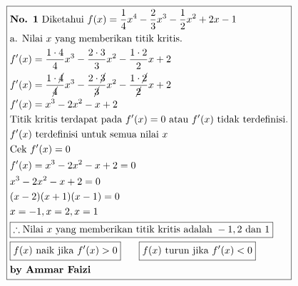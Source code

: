 \documentclass[13pt]{article}
\begin{document}
\par\noindent
\begin{fleqn}[4em]

\begin{align*}
\boxed{\begin{aligned}
  & \textbf{No. 1} \text{ Diketahui }
    f(x) = \frac{1}{4} x^4 - \frac{2}{3} x^3 - \frac{1}{2} x^2 + 2x - 1 \\
  & \text{a. Nilai } x \text{ yang memberikan titik kritis.} \\
  & f'(x) = \frac{1 \cdot 4}{4} x^3 - \frac{2 \cdot 3}{3} x^2 - \frac{1 \cdot 2}{2} x + 2 \\
  & f'(x) = \frac{1 \cdot \cancel{4}}{\cancel{4}} x^3 - \frac{2 \cdot \cancel{3}}{\cancel{3}} x^2 - \frac{1 \cdot \cancel{2}}{\cancel{2}} x + 2 \\
  & f'(x) = x^3 - 2x^2 - x + 2 \\
  & \text{Titik kritis terdapat pada } f'(x) = 0 \text{ atau } f'(x) \text{ tidak terdefinisi.} \\
  & f'(x) \text{ terdefinisi untuk semua nilai } x \\
  & \text{Cek } f'(x) = 0 \\
  & f'(x) = x^3 - 2x^2 - x + 2 = 0 \\
  & x^3 - 2x^2 - x + 2 = 0 \\
  & (x - 2)(x + 1)(x - 1) = 0 \\
  & x = -1, x = 2, x = 1 \\
  & \boxed{\therefore \text{Nilai } x \text{ yang memberikan titik kritis adalah } -1, 2 \text{ dan } 1} \\
  & \boxed{\begin{aligned}
    & f(x) \text{ naik jika } f'(x) > 0 \\
    \end{aligned}}\;~\;~\;~
    \boxed{\begin{aligned}
    & f(x) \text{ turun jika } f'(x) < 0 \\
    \end{aligned}}
  \\ & \textbf{by Ammar Faizi}
\end{aligned}}
\end{align*}

\end{fleqn}
\end{document}
